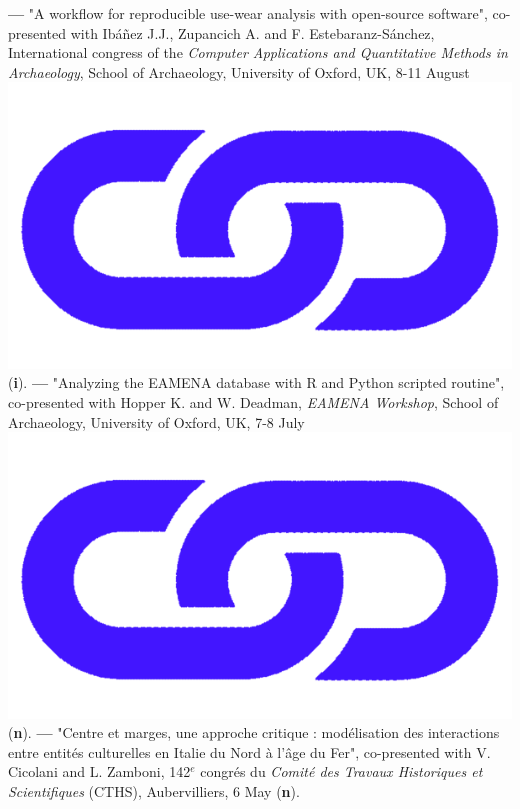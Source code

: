 \documentclass{article}
\begin{document}
\smallbreak
\textbf{--- }"A workflow for reproducible use-wear analysis with open-source software", co-presented with Ibáñez J.J., Zupancich A. and F. Estebaranz-Sánchez, International congress of the \textit{Computer Applications and Quantitative Methods in Archaeology}, School of Archaeology, University of Oxford, UK, 8-11 August \href{https://zoometh.github.io/reveal.js/projects/caa_3dlithic}{\includegraphics[scale=0.02]{link_darkblue.png}} (\textbf{i}).
\smallbreak
\textbf{--- }"Analyzing the EAMENA database with R and Python scripted routine", co-presented with Hopper K. and W. Deadman, \textit{EAMENA Workshop}, School of Archaeology, University of Oxford, UK, 7-8 July \href{https://eamena-project.github.io/reveal.js/projects/time.html}{\includegraphics[scale=0.02]{link_darkblue.png}} (\textbf{n}).
\textbf{--- }"Centre et marges, une approche critique : modélisation des interactions entre entités culturelles en Italie du Nord à l'âge du Fer", co-presented with V. Cicolani and L. Zamboni, 142${}^{e}$ congr\'{e}s du \textit{Comit\'{e} des Travaux Historiques et Scientifiques} (CTHS), Aubervilliers, 6 May (\textbf{n}).
\smallbreak
\end{document}
